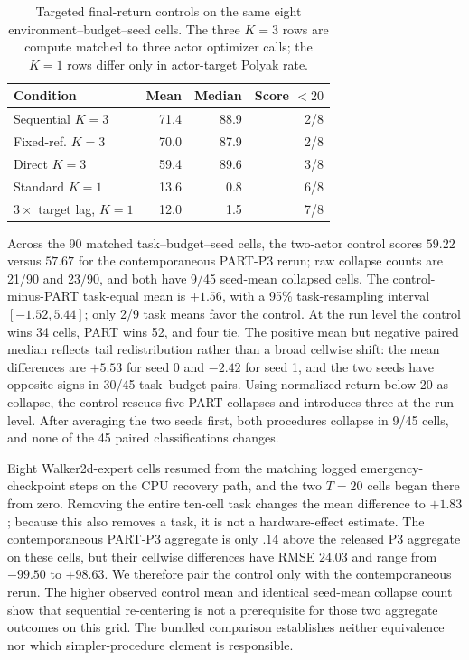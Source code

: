 \documentclass[twoside]{article}
\begin{document}
\begin{table}[t]
\caption{Targeted final-return controls on the same eight environment--budget--seed cells. The three $K=3$ rows are compute matched to three actor optimizer calls; the $K=1$ rows differ only in actor-target Polyak rate.}
\centering
\small
\begin{tabular}{lrrr}
\toprule
Condition & Mean & Median & Score $<20$\\
\midrule
Sequential $K=3$ &71.4&88.9&2/8\\
Fixed-ref. $K=3$ &70.0&87.9&2/8\\
Direct $K=3$ &59.4&89.6&3/8\\
\midrule
Standard $K=1$ &13.6&0.8&6/8\\
$3\times$ target lag, $K=1$ &12.0&1.5&7/8\\
\bottomrule
\end{tabular}
\label{tab:targeted_controls}
\end{table}

Across the 90 matched task--budget--seed cells, the two-actor control scores
$59.22$ versus $57.67$ for the contemporaneous PART-P3 rerun; raw collapse
counts are 21/90 and 23/90, and both have 9/45 seed-mean collapsed cells. The
control-minus-PART task-equal mean is $+1.56$, with a 95\% task-resampling
interval $[-1.52,5.44]$; only 2/9 task means favor the control.
At the run level the control wins 34 cells, PART wins 52, and four tie. The
positive mean but negative paired median reflects tail redistribution rather
than a broad cellwise shift: the mean differences are $+5.53$ for seed 0 and
$-2.42$ for seed 1, and the two seeds have opposite signs in 30/45
task--budget pairs. Using normalized return below 20 as collapse, the control
rescues five PART collapses and introduces three at the run level. After
averaging the two seeds first, both procedures collapse in 9/45 cells, and
none of the 45 paired classifications changes.

Eight Walker2d-expert cells resumed from the matching logged
emergency-checkpoint steps on the CPU recovery path, and the two $T=20$ cells
began there from zero. Removing the entire ten-cell task changes the mean
difference to $+1.83$; because this also
removes a task, it is not a hardware-effect estimate. The contemporaneous
PART-P3 aggregate is only $.14$ above the released P3 aggregate on these cells,
but their cellwise differences have RMSE $24.03$ and range from $-99.50$ to
$+98.63$. We therefore pair the control only with the contemporaneous rerun.
The higher observed control mean and identical seed-mean collapse count show
that sequential re-centering is not a prerequisite for those two aggregate
outcomes on this grid. The bundled comparison establishes neither equivalence
nor which simpler-procedure element is responsible.
\end{document}
